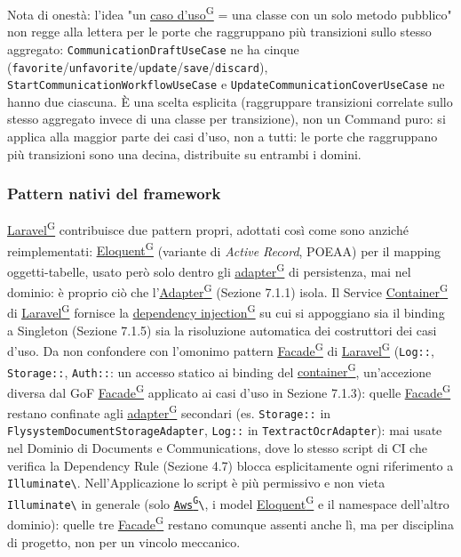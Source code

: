 \documentclass[a4paper,12pt]{article}
\providecommand{\glslink}[2]{\href{https://alittlebyte-19.github.io/Documentazione/glossario.html\#gls-#1}{\underline{#2}\textsuperscript{\scriptsize G}}}
\begin{document}
\begin{sloppypar}
Nota di onestà: l'idea "un \glslink{caso-d-uso-uc}{caso d'uso} = una classe con un solo metodo pubblico" non regge alla lettera per le porte che raggruppano più transizioni sullo stesso aggregato: \texttt{CommunicationDraftUseCase} ne ha cinque (\texttt{favorite}/\texttt{unfavorite}/\texttt{update}/\texttt{save}/\texttt{discard}), \texttt{StartCommunicationWorkflowUseCase} e \texttt{UpdateCommunicationCoverUseCase} ne hanno due ciascuna. È una scelta esplicita (raggruppare transizioni correlate sullo stesso aggregato invece di una classe per transizione), non un Command puro: si applica alla maggior parte dei casi d'uso, non a tutti: le porte che raggruppano più transizioni sono una decina, distribuite su entrambi i domini.

\subsubsection{Pattern nativi del framework}

\glslink{laravel}{Laravel} contribuisce due pattern propri, adottati così come sono anziché reimplementati: \glslink{eloquent}{Eloquent} (variante di \textit{Active Record}, POEAA) per il mapping oggetti-tabelle, usato però solo dentro gli \glslink{adapter}{adapter} di persistenza, mai nel dominio: è proprio ciò che l'\glslink{adapter}{Adapter} (Sezione 7.1.1) isola. Il Service \glslink{container}{Container} di \glslink{laravel}{Laravel} fornisce la \glslink{dependency-injection}{dependency injection} su cui si appoggiano sia il binding a Singleton (Sezione 7.1.5) sia la risoluzione automatica dei costruttori dei casi d'uso. Da non confondere con l'omonimo pattern \glslink{facade}{Facade} di \glslink{laravel}{Laravel} (\texttt{Log::}, \texttt{Storage::}, \texttt{Auth::}: un accesso statico ai binding del \glslink{container}{container}, un'accezione diversa dal GoF \glslink{facade}{Facade} applicato ai casi d'uso in Sezione 7.1.3): quelle \glslink{facade}{Facade} restano confinate agli \glslink{adapter}{adapter} secondari (es. \texttt{Storage::} in \texttt{FlysystemDocumentStorageAdapter}, \texttt{Log::} in \texttt{TextractOcrAdapter}): mai usate nel Dominio di Documents e Communications, dove lo stesso script di CI che verifica la Dependency Rule (Sezione 4.7) blocca esplicitamente ogni riferimento a \texttt{Illuminate\textbackslash*}. Nell'Applicazione lo script è più permissivo e non vieta \texttt{Illuminate\textbackslash*} in generale (solo \texttt{\glslink{aws}{Aws}\textbackslash*}, i model \glslink{eloquent}{Eloquent} e il namespace dell'altro dominio): quelle tre \glslink{facade}{Facade} restano comunque assenti anche lì, ma per disciplina di progetto, non per un vincolo meccanico.


\end{sloppypar}
\end{document}

